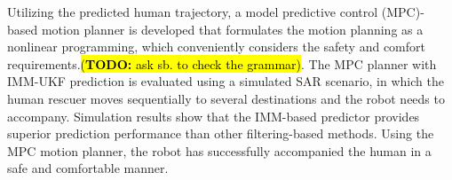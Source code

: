 \documentclass[letterpaper, 10 pt, conference]{ieeeconf}
\newcommand{\todohere}[1]{\hl{(\textbf{TODO:} #1)}}
\begin{document}
	Utilizing the predicted human trajectory, a model predictive control (MPC)-based motion planner is developed that formulates the motion planning as a nonlinear programming, which conveniently considers the safety and comfort requirements.\todohere{ask sb. to check the grammar}.
	The MPC planner with IMM-UKF prediction is evaluated using a simulated SAR scenario, in which the human rescuer moves sequentially to several destinations and the robot needs to accompany. 
	Simulation results show that the IMM-based predictor provides superior prediction performance than other filtering-based methods.
	Using the MPC motion planner, the robot has successfully accompanied the human in a safe and comfortable manner.
\end{document}
